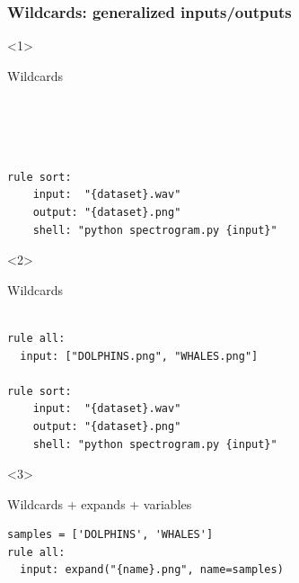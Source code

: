 \documentclass{beamer}
\begin{document}
\begin{frame}[fragile]
\frametitle{Wildcards: generalized inputs/outputs}
\small
{}
\begin{center}
    \begin{minipage}{11cm}
        \begin{onlyenv}<1>            
            \begin{block}{Wildcards}
                \begin{lstlisting}[basicstyle=\large]
            
            
       
  
rule sort:
    input:  "{dataset}.wav"
    output: "{dataset}.png"
    shell: "python spectrogram.py {input}"  
                  \end{lstlisting}    
               \end{block}

            \end{onlyenv}        
    
    \begin{onlyenv}<2>   
        \begin{block}{Wildcards}
            \begin{lstlisting}[basicstyle=\large]            
            
rule all:
  input: ["DOLPHINS.png", "WHALES.png"]
  
rule sort:
    input:  "{dataset}.wav"
    output: "{dataset}.png"
    shell: "python spectrogram.py {input}"  

    \end{lstlisting}    
        \end{block}
             \end{onlyenv}

         
    \begin{onlyenv}<3>  
        \begin{block}{Wildcards + expands + variables}
            \begin{lstlisting}[basicstyle=\large] 
samples = ['DOLPHINS', 'WHALES']            
rule all:
  input: expand("{name}.png", name=samples)


\end{lstlisting}
\end{block}
\end{onlyenv}
\end{minipage}
\end{center}
\end{frame}
\end{document}
